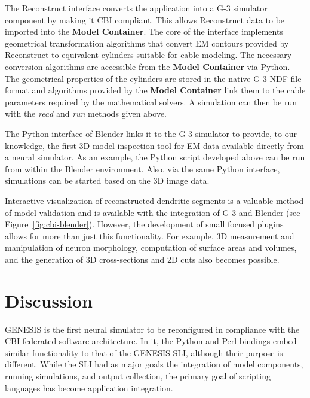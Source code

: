 \documentclass[10pt]{article}
\begin{document}
The Reconstruct interface converts the application
into a G-3 simulator component by making it CBI compliant. This allows
Reconstruct data to be imported into the {\bf Model Container}.
The core of the interface implements geometrical transformation
algorithms that convert EM contours provided by Reconstruct to
equivalent cylinders suitable for cable modeling. The necessary conversion algorithms are accessible from the
{\bf Model Container} via Python.
The geometrical properties of the cylinders are stored in the native
G-3 NDF file format and algorithms provided by the {\bf Model Container}
link them to the cable parameters required by the mathematical
solvers.  A simulation can then be run with the {\it read} and {\it
  run} methods given above.

The Python interface of Blender links it to the G-3 simulator to
provide, to our knowledge, the first 3D model inspection tool for EM
data available directly from a neural simulator.  As an example, the
Python script developed above can be run from within the Blender
environment.  Also, via the same Python interface, simulations can be
started based on the 3D image data.

Interactive visualization of reconstructed dendritic segments is a
valuable method of model validation and is available with the
integration of G-3 and Blender (see Figure~\ref{fig:cbi-blender}).
However, the development of small focused plugins allows for more than
just this functionality. For example, 3D measurement and manipulation of
neuron morphology, computation of surface areas and volumes, and the
generation of 3D cross-sections and 2D cuts also becomes possible.

\section*{\LARGE Discussion}

GENESIS is the first neural simulator to be reconfigured in compliance
with the CBI federated software architecture. In it, the Python and Perl bindings embed similar
functionality to that of the GENESIS SLI, although their purpose is different.
While the SLI had as major goals the integration of model components,
running simulations, and output collection, the primary goal of
scripting languages has become application
integration.
\end{document}
